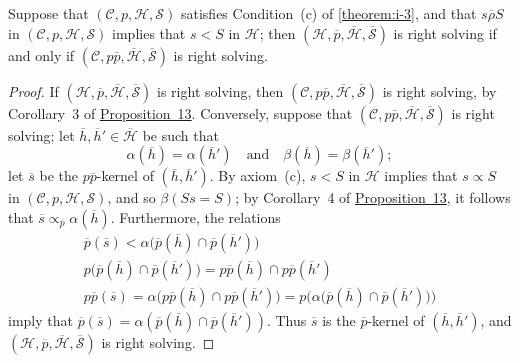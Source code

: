 \documentclass[a4paper,fleqn]{article}
\theoremstyle{plain}
\newenvironment{proposition}[1]
  {\renewcommand\theinnerproposition{#1}\innerproposition}
  {\endinnerproposition}
\theoremstyle{definition}
\newcommand{\textand}{\quad\text{and}\quad}
\newcommand{\CC}{\mathcal{C}}
\newcommand{\HH}{\mathcal{H}}
\newcommand{\bHH}{\overline{\HH}}
\renewcommand{\SS}{\mathcal{S}}
\newcommand{\bSS}{\overline{\SS}}
\newcommand{\relrhobar}{\mathrel{\overline{\rho}}}
\newcommand{\subs}{\mathrel{\propto}}
\begin{document}
\begin{proposition}{14}
\label{proposition:i-14}
  Suppose that $(\CC,p,\HH,\SS)$ satisfies Condition~(c) of \cref{theorem:i-3}, and that $s\relrhobar S$ in $(\CC,p,\HH,\SS)$ implies that $s<S$ in $\HH$;
  then $(\HH,\overline{p},\bHH,\bSS)$ is right solving if and only if $(\CC,p\overline{p},\bHH,\bSS)$ is right solving.
\end{proposition}

\begin{proof}
  If $(\HH,\overline{p},\bHH,\bSS)$ is right solving, then $(\CC,p\overline{p},\bHH,\bSS)$ is right solving, by Corollary~3 of \hyperref[proposition:i-13]{Proposition~13}.
  Conversely, suppose that $(\CC,p\overline{p},\bHH,\bSS)$ is right solving;
  let $\overline{h},\overline{h}'\in\bHH$ be such that
  \[
    \alpha(\overline{h})=\alpha(\overline{h}')
    \textand
    \beta(\overline{h})=\beta(\overline{h}');
  \]
  let $\overline{s}$ be the $p\overline{p}$-kernel of $(\overline{h},\overline{h}')$.
  By axiom~(c), $s<S$ in $\HH$ implies that $s\subs S$ in $(\CC,p,\HH,\SS)$, and so $\beta(Ss=S)$;
  by Corollary~4 of \hyperref[proposition:i-13]{Proposition~13}, it follows that $\overline{s}\subs_{\overline{p}}\alpha(\overline{h})$.
  Furthermore, the relations
  \[
    \begin{gathered}
      \overline{p}(\overline{s})
      < \alpha\big(
        \overline{p}(\overline{h})\cap\overline{p}(\overline{h}')
      \big)
    \\p\big(
        \overline{p}(\overline{h})\cap\overline{p}(\overline{h}')
      \big)
      = p\overline{p}(\overline{h})\cap p\overline{p}(\overline{h}')
    \\p\overline{p}(\overline{s})
      = \alpha\big(
        p\overline{p}(\overline{h})\cap p\overline{p}(\overline{h}')
      \big)
      = p\big(
        \alpha\big(
          \overline{p}(\overline{h})\cap\overline{p}(\overline{h}')
        \big)
      \big)
    \end{gathered}
  \]
  imply that $\overline{p}(\overline{s})=\alpha(\overline{p}(\overline{h})\cap\overline{p}(\overline{h}'))$.
  Thus $\overline{s}$ is the $\overline{p}$-kernel of $(\overline{h},\overline{h}')$, and $(\HH,\overline{p},\bHH,\bSS)$ is right solving.
\end{proof}
\end{document}
